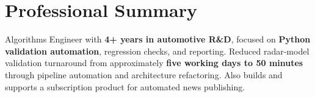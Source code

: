 \section*{Professional Summary}
\begin{center}
    \begin{minipage}{0.97\textwidth}
        \small{Algorithms Engineer with \textbf{4+ years in automotive R\&D}, focused on \textbf{Python validation automation}, regression checks, and reporting. Reduced radar-model validation turnaround from approximately \textbf{five working days to 50 minutes} through pipeline automation and architecture refactoring. Also builds and supports a subscription product for automated news publishing.}
    \end{minipage}
\end{center}
\vspace{-5pt}